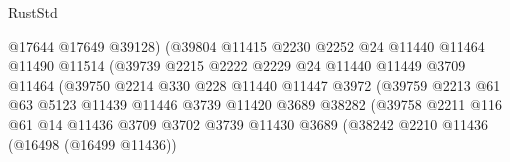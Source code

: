 \begin{lexlean}{RustStd}
\begin{coremodule}
                                      @17644
                                      @17649
                                      @39128)
                                    (@39804
                                      @11415
                                      @2230
                                      @2252
                                      @24
                                      @11440
                                      @11464
                                      @11490
                                      @11514
                                      (@39739
                                        @2215
                                        @2222
                                        @2229
                                        @24
                                        @11440
                                        @11449
                                        @3709
                                        @11464
                                        (@39750
                                          @2214
                                          @330
                                          @228
                                          @11440
                                          @11447
                                          @3972
                                          (@39759
                                            @2213
                                            @61
                                            @63
                                            @5123
                                            @11439
                                            @11446
                                            @3739
                                            @11420
                                            @3689
                                            @38282
                                            (@39758
                                              @2211
                                              @116
                                              @61
                                              @14
                                              @11436
                                              @3709
                                              @3702
                                              @3739
                                              @11430
                                              @3689
                                              (@38242
                                                @2210
                                                @11436
                                                (@16498 (@16499 @11436))

\end{coremodule}
\end{lexlean}
